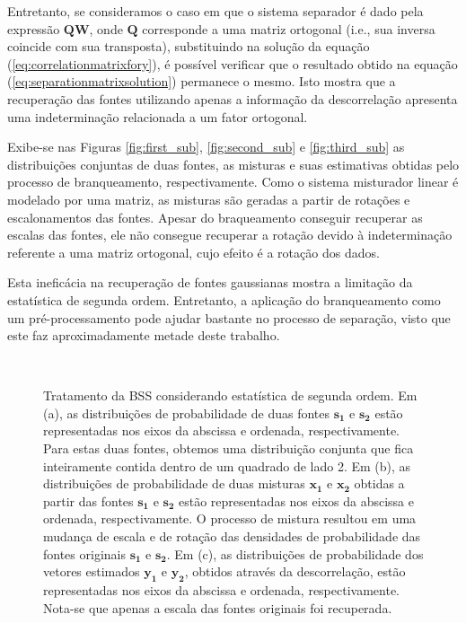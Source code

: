     Entretanto, se consideramos o caso em que o sistema separador é dado pela expressão $\mathbf{QW}$, onde $\mathbf{Q}$ corresponde a uma matriz ortogonal (i.e., sua inversa coincide com sua transposta), substituindo na solução da equação (\ref{eq:correlationmatrixfory}), é possível verificar que o resultado obtido na equação (\ref{eq:separationmatrixsolution}) permanece o mesmo. Isto mostra que a recuperação das fontes utilizando apenas a informação da descorrelação apresenta uma indeterminação relacionada a um fator ortogonal.
    
    Exibe-se nas Figuras \ref{fig:first_sub}, \ref{fig:second_sub} e \ref{fig:third_sub} as distribuições conjuntas de duas fontes, as misturas e suas estimativas obtidas pelo processo de branqueamento, respectivamente. Como o sistema misturador linear é modelado por uma matriz, as misturas são geradas a partir de rotações e escalonamentos das fontes. Apesar do braqueamento conseguir recuperar as escalas das fontes, ele não consegue recuperar a rotação devido à indeterminação referente a uma matriz ortogonal, cujo efeito é a rotação dos dados.
    
    Esta ineficácia na recuperação de fontes gaussianas mostra a limitação da estatística de segunda ordem. Entretanto, a aplicação do branqueamento como um pré-processamento pode ajudar bastante no processo de separação, visto que este faz aproximadamente metade deste trabalho.
    
\begin{figure}
    \centering
    \\
    \caption{Tratamento da BSS considerando estatística de segunda ordem. Em (a), as distribuições de probabilidade de duas fontes $\mathbf{s_1}$ e $\mathbf{s_2}$ estão representadas nos eixos da abscissa e ordenada, respectivamente. Para estas duas fontes, obtemos uma distribuição conjunta que fica inteiramente contida dentro de um quadrado de lado 2. Em (b), as distribuições de probabilidade de duas misturas $\mathbf{x_1}$ e $\mathbf{x_2}$ obtidas a partir das fontes $\mathbf{s_1}$ e $\mathbf{s_2}$ estão representadas nos eixos da abscissa e ordenada, respectivamente. O processo de mistura resultou em uma mudança de escala e de rotação das densidades de probabilidade das fontes originais $\mathbf{s_1}$ e $\mathbf{s_2}$. Em (c), as distribuições de probabilidade dos vetores estimados $\mathbf{y_1}$ e $\mathbf{y_2}$, obtidos através da descorrelação, estão representadas nos eixos da abscissa e ordenada, respectivamente. Nota-se que apenas a escala das fontes originais foi recuperada. }
    \label{fig:sample_subfigures}
\end{figure}


